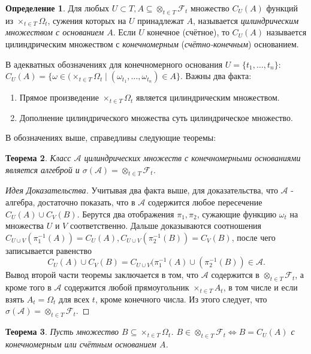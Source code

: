 \documentclass[16pt]{article}
\newtheorem{theorem}{Теорема}[section]
\theoremstyle{definition}
\newtheorem{definition}[theorem]{Определение}
\begin{document}
\begin{definition}
Для любых $U \subset T, A \subseteq \otimes_{t \in T}\mathcal{F}_t$ множество $C_U(A)$ функций из $\times_{t \in T}\Omega_t$, сужения которых на $U$ принадлежат $A$, называется \textit{цилиндрическим множеством с основанием $A$}. Если $U$ конечное (счётное), то $C_U(A)$ называется цилиндрическим множеством с \textit{конечномерным} (\textit{счётно-конечным}) основанием.
\end{definition}
В адекватных обозначениях для конечномерного основания $U = \{t_1, \ldots, t_n\}$: $C_U(A) = \{\omega \in (\times_{t \in T}\Omega_t \mid (\omega_{t_1}, \ldots, \omega_{t_n}) \in A\}$. 
Важны два факта: 
\begin{enumerate}
    \item Прямое произведение $\times_{t \in T}\Omega_t$ является цилиндрическим множеством.
    \item Дополнение цилиндрического множества суть цилиндрическое множество.
\end{enumerate} 
В обозначениях выше, справедливы следующие теоремы:
\begin{theorem}
Класс $\mathcal{A}$ цилиндрических множеств с конечномерными основаниями является алгеброй и $\sigma(\mathcal{A}) = \otimes_{t \in T}\mathcal{F}_t$.
\end{theorem}
\begin{proof}[Идея Доказательства]
Учитывая два факта выше, для доказательства, что $\mathcal{A}$ - алгебра, достаточно показать, что в $\mathcal{A}$ содержится любое пересечение $C_U(A) \cup C_V(B)$. Берутся два отображения $\pi_1, \pi_2$, сужающие функцию $\omega_t$ на множества $U$ и $V$ соответственно. Дальше доказываются соотношения $C_{U \cup V}(\pi_1^{-1}(A)) = C_U(A), C_{U \cup V}(\pi_2^{-1}(B)) = C_V(B)$, после чего записывается равенство $$C_U(A) \cup C_V(B) = C_{U \cup V}(\pi_1^{-1}(A) \cup (\pi_2^{-1}(B)) \in \mathcal{A}.$$ Вывод второй части теоремы заключается в том, что $\mathcal{A}$ содержится в $\otimes_{t \in T}\mathcal{F}_t$, а кроме того в $\mathcal{A}$ содержится любой прямоугольник $\times_{t \in T}A_t$, в том числе и если взять $A_t = \Omega_t$ для всех $t$, кроме конечного числа. Из этого следует, что $\sigma(\mathcal{A}) = \otimes_{t \in T}\mathcal{F}_t$.
\end{proof}
\begin{theorem}
Пусть множество $B \subseteq \times_{t \in T}\Omega_t$. \newline $B \in \otimes_{t \in T}\mathcal{F}_t \Longleftrightarrow B = C_U(A)$ с конечномерным или счётным основанием $A$.
\end{theorem}
\end{document}
